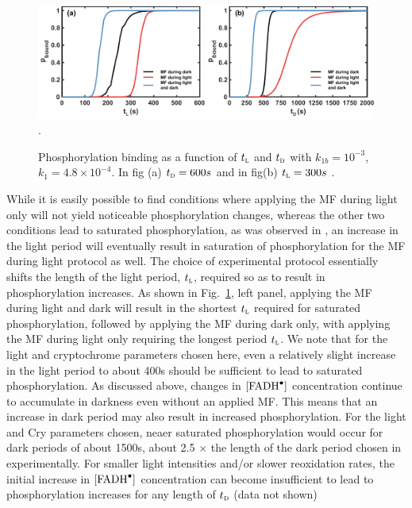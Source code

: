 \documentclass[twoside,twocolumn,9pt]{article}
\begin{document}
\begin{figure}[h]
	\centering
	\includegraphics{varyT1T2.pdf}.
	\caption{Phosphorylation binding as a function of $t_{\textsc{l}}$ and $t_{\textsc{d}}$ with $k_{1b} = 10^{-3}$, $k_{1} = 4.8
	\times 10^{-4}$. In fig (a) $t_{\textsc{d}} = 600s$ and in fig(b) $t_{\textsc{l}} = 300s$ .}
	\label{fig:varyT1T2}
\end{figure}

While it is easily possible to find conditions where applying the MF during light only will not yield noticeable phosphorylation
changes, whereas the other two conditions lead to saturated phosphorylation, as was observed in \cite{Hammad2019}, an increase in
the light period will eventually result in saturation of phosphorylation for the MF during light protocol as well. The choice of
experimental protocol essentially shifts the length of the light period, $t_{\textsc{l}}$, required so as to result in
phosphorylation increases. As shown in Fig.~\ref{fig:varyT1T2}, left panel, applying the MF during light and dark will result in
the shortest $t_{\textsc{l}}$ required for saturated phosphorylation, followed by applying the MF during dark only, with applying
the MF during light only requiring the longest period $t_{\textsc{l}}$. We note that for the light and cryptochrome parameters
chosen here, even a relatively slight increase in the light period to about 400s should be sufficient to lead to saturated
phosphorylation. As discussed above, changes in $[\ce{FADH^{.}}]$ concentration continue to accumulate in darkness even without an
applied MF. This means that an increase in dark period may also result in increased phosphorylation. For the light and Cry
parameters chosen, neaer saturated phosphorylation would occur for dark periods of about 1500s, about 2.5 $\times$ the length of
the dark period chosen in experimentally. \cite{Pooam2019, Hammad2019} For smaller light intensities and/or slower reoxidation
rates, the initial increase in $[\ce{FADH^{.}}]$ concentration can become insufficient to lead to phosphorylation increases for any
length of $t_{\textsc{d}}$ (data not shown)
\end{document}
